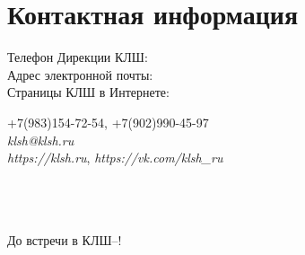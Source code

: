 


\section*{Контактная информация}

\newlength{\address}
\settowidth{\address}{Страницы КЛШ в Интернете:\ \ }

\noindent\parbox[t][0pt]{\address} %
{
\noindent Телефон Дирекции КЛШ:\\
\noindent Адрес электронной почты:\\
\noindent Страницы КЛШ в Интернете:\\
}
\parbox[t][0pt]{0.5\textwidth}
{
+7(983)154-72-54, +7(902)990-45-97\\
{\EnglishIntroSize \textit{klsh@klsh.ru}}\\
{\EnglishIntroSize \textit{https://klsh.ru}, 	\textit{https://vk.com/klsh{\_}ru}}
}
\vspace{\baselineskip}
\\ \\ \\
До встречи в КЛШ–\theyear{}!
